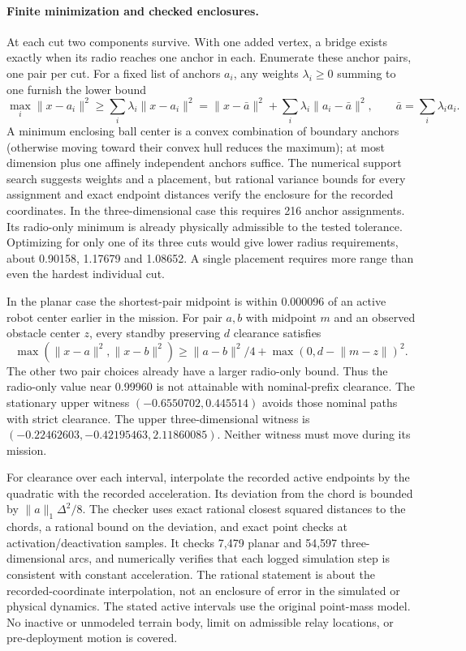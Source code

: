 \documentclass[11pt]{article}
\begin{document}
\paragraph{Finite minimization and checked enclosures.}
At each cut two components survive. With one added vertex, a bridge exists exactly when its radio reaches one anchor in each. Enumerate these anchor pairs, one pair per cut. For a fixed list of anchors $a_i$, any weights $\lambda_i\ge0$ summing to one furnish the lower bound
\[
 \max_i\lVert x-a_i\rVert^2 \ge
 \sum_i\lambda_i\lVert x-a_i\rVert^2
 =\lVert x-\bar a\rVert^2+\sum_i\lambda_i\lVert a_i-\bar a\rVert^2,\qquad
 \bar a=\sum_i\lambda_i a_i.
\]
A minimum enclosing ball center is a convex combination of boundary anchors (otherwise moving toward their convex hull reduces the maximum); at most dimension plus one affinely independent anchors suffice. The numerical support search suggests weights and a placement, but rational variance bounds for every assignment and exact endpoint distances verify the enclosure for the recorded coordinates. In the three-dimensional case this requires 216 anchor assignments. Its radio-only minimum is already physically admissible to the tested tolerance. Optimizing for only one of its three cuts would give lower radius requirements, about 0.90158, 1.17679 and 1.08652. A single placement requires more range than even the hardest individual cut.

In the planar case the shortest-pair midpoint is within 0.000096 of an active robot center earlier in the mission. For pair $a,b$ with midpoint $m$ and an observed obstacle center $z$, every standby preserving $d$ clearance satisfies
\[
 \max(\lVert x-a\rVert^2,\lVert x-b\rVert^2)
 \ge \lVert a-b\rVert^2/4+\max(0,d-\lVert m-z\rVert)^2.
\]
The other two pair choices already have a larger radio-only bound. Thus the radio-only value near 0.99960 is not attainable with nominal-prefix clearance. The stationary upper witness $(-0.6550702,0.445514)$ avoids those nominal paths with strict clearance. The upper three-dimensional witness is $(-0.22462603,-0.42195463,2.11860085)$. Neither witness must move during its mission.

For clearance over each interval, interpolate the recorded active endpoints by the quadratic with the recorded acceleration. Its deviation from the chord is bounded by $\lVert a\rVert_1\Delta^2/8$. The checker uses exact rational closest squared distances to the chords, a rational bound on the deviation, and exact point checks at activation/deactivation samples. It checks 7,479 planar and 54,597 three-dimensional arcs, and numerically verifies that each logged simulation step is consistent with constant acceleration. The rational statement is about the recorded-coordinate interpolation, not an enclosure of error in the simulated or physical dynamics. The stated active intervals use the original point-mass model. No inactive or unmodeled terrain body, limit on admissible relay locations, or pre-deployment motion is covered.
\end{document}
